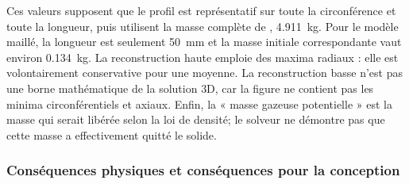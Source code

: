 \documentclass[oneside,openany]{amsdtx}
\begin{document}
Ces valeurs supposent que le profil est représentatif sur toute la
circonférence et toute la longueur, puis utilisent la masse complète de
, \SI{4.911}{kg}. Pour le modèle maillé, la longueur est seulement
\SI{50}{mm} et la masse initiale correspondante vaut environ \SI{0.134}{kg}.
La reconstruction haute emploie des maxima radiaux : elle est volontairement
conservative pour une moyenne. La reconstruction basse n'est pas une borne
mathématique de la solution 3D, car la figure ne contient pas les minima
circonférentiels et axiaux. Enfin, la « masse gazeuse potentielle » est la masse
qui serait libérée selon la loi de densité; le solveur ne démontre pas que cette
masse a effectivement quitté le solide.

\subsubsection{Conséquences physiques et conséquences pour la conception}
\end{document}
